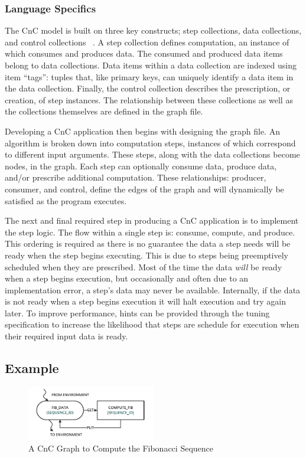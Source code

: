 \subsubsection{Language Specifics}
The CnC model is built on three key constructs; step collections, data
collections, and control collections ~\cite{budimlicconcurrent}. A
step collection defines computation, an instance of which consumes and
produces data. The consumed and produced data items belong to data
collections. Data items within a data collection are indexed using
item ``tags'': tuples that, like primary keys, can uniquely identify a
data item in the data collection. Finally, the control collection
describes the prescription, or creation, of step instances. The
relationship between these collections as well as the collections
themselves are defined in the graph file.

Developing a CnC application then begins with designing the graph
file. An algorithm is broken down into computation steps, instances of
which correspond to different input arguments. These steps, along with
the data collections become nodes, in the graph. Each step can
optionally consume data, produce data, and/or prescribe additional
computation. These relationships: producer, consumer, and control,
define the edges of the graph and will dynamically be satisfied as the
program executes.

The next and final required step in producing a CnC application is to
implement the step logic. The flow within a single step is: consume,
compute, and produce. This ordering is required as there is no
guarantee the data a step needs will be ready when the step begins
executing. This is due to steps being preemptively scheduled when they
are prescribed. Most of the time the data \emph{will} be ready when a
step begins execution, but occasionally and often due to an
implementation error, a step's data may never be available.
Internally, if the data is not ready when a step begins execution
it will halt execution and try again later. To improve performance,
hints can be provided through the tuning specification to increase the
likelihood that steps are schedule for execution when their required
input data is ready.

\subsection{Example}

\begin{figure}[!tb]
  \centering
  \includegraphics[width=0.5\textwidth]{drawings/FibExample.pdf}
  \caption{A CnC Graph to Compute the Fibonacci Sequence}
  \label{fig:fib_graph}
\end{figure}


